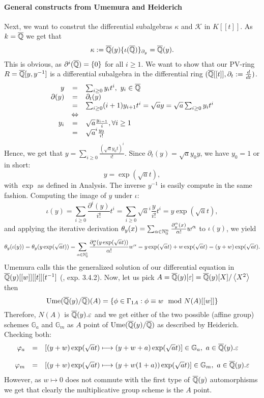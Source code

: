 \paragraph{General constructs from Umemura and Heiderich}
Next, we want to construt the differential subalgebras $\kappa$ and $\mathcal{K}$ in $K[[t]]$. As $k = \currfield$ we get that
$$\kappa := \currfield(y)\{\iota(\currfield)\}_{\partial_y} = \currfield(y).$$
This is obvious, as $\partial^i(\currfield) = \{0\}$ for all $i \geq 1$. We want to show that our PV-ring $R = \currfield[y,y^{-1}]$ is a differential subalgebra in the differential ring $(\currfield[[t]], \partial_t := \frac{d}{d t})$.
$$\bao{rcl}
y &=& \sum_{i \geq 0} y_i t^i,\ y_i \in \currfield\\
\partial(y) &=& \partial_t(y)\\
&=&\sum_{i \geq 0} (i + 1) y_{i + 1} t^{i} = \sqrt{a} y = \sqrt{a} \sum_{i\geq 0} y_i t^i\\
&\LRA&\\
y_{i} &=& \sqrt{a}\frac{y_{i-1}}{i}, \forall i \geq 1\\
&=& \sqrt{a}^i \frac{y_0}{i!}\\
\ea$$
Hence, we get that $y = \sum_{i \geq 0} \frac{(\sqrt{a} y_0 t)^i}{i!}$. Since $\partial_t(y) = \sqrt{a} y_0 y$, we have $y_0 = 1$ or in short:
$$y = \exp(\sqrt{a} t),$$
with $\exp$ as defined in Analysis. The inverse $y^{-1}$ is easily compute in the same fashion. Computing the image of $y$ under $\iota$:
$$
\iota(y) = \sum_{i \geq 0} \frac{\partial^i(y)}{i!} t^i = \sum_{i \geq 0} \sqrt{a}^i \frac{y}{i!} t^i
= y \exp(\sqrt{a} t),$$
and applying the iterative derivation 
$\theta_y(x) = \sum_{\alpha \in \nz_0^n} \frac{\partial_y^\alpha(x)}{\alpha!} w^\alpha$ to $\iota(y)$, we yield
$$\theta_y(\iota(y)) = \theta_y(y \exp(\sqrt{a}t )) = \sum_{\alpha \in \nz_0^1} \frac{\partial_y^\alpha(y \exp(\sqrt{a}t ))}{\alpha!} w^\alpha = y \exp(\sqrt{a}t ) + w \exp(\sqrt{a}t ) = (y + w)\exp(\sqrt{a}t ).$$
Umemura calls this the generalized solution of our differential equation in $\currfield(y)[[w]][[t]][t^{-1}]$ (\cite{Ume96b}, exp. 3.4.2). Now, let us pick $A = \currfield(y)[\eps] = \currfield(y)[X]/\left<X^2\right>$ then $$\trm{Ume}(\currfield(y)/\currfield)(A) = \{\phi \in \Gamma_{1 A} : \phi \equiv w \mod N(A)[[w]]\}$$
Therefore, $N(A)$ is $\currfield(y).\eps$ and we get either of the two possible (affine group) schemes $\mathbb{G}_a$ and $\mathbb{G}_m$ as $A$ point of $\trm{Ume}(\currfield(y)/\currfield)$ as described by Heiderich. Checking both:
$$\bao{rcl}
\varphi_a &=& [(y + w) \exp (\sqrt{a} t) \longmapsto (y + w + a) \exp (\sqrt{a} t)] \in \mathbb{G}_a,\ a \in \currfield(y).\eps\\
&&\\
\varphi_m &=& [(y + w) \exp (\sqrt{a} t) \longmapsto (y + w (1 + a)) \exp (\sqrt{a} t)] \in \mathbb{G}_m,\ a \in \currfield(y).\eps
\ea$$
However, as $w \longmapsto 0$ does not commute with the first type of $\currfield(y)$ automorphisms we get that clearly the multiplicative group scheme is the $A$ point.
